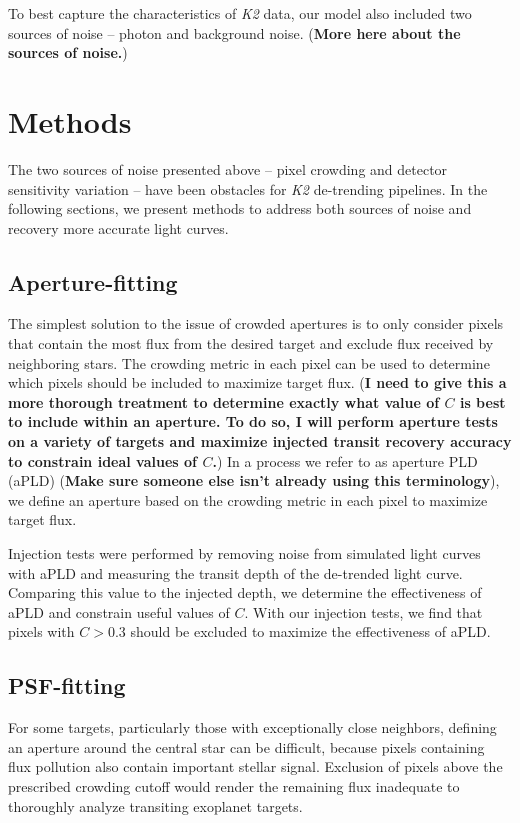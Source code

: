 \documentclass[12pt,preprint]{aastex}
\begin{document}
To best capture the characteristics of \textit{K2} data, our model also included two sources of noise -- photon and background noise. (\textbf{More here about the sources of noise.})

\section{Methods}

The two sources of noise presented above -- pixel crowding and detector sensitivity variation -- have been obstacles for \textit{K2} de-trending pipelines. In the following sections, we present methods to address both sources of noise and recovery more accurate light curves.

\subsection{Aperture-fitting}

The simplest solution to the issue of crowded apertures is to only consider pixels that contain the most flux from the desired target and exclude flux received by neighboring stars. The crowding metric in each pixel can be used to determine which pixels should be included to maximize target flux. (\textbf{I need to give this a more thorough treatment to determine exactly what value of $C$ is best to include within an aperture. To do so, I will perform aperture tests on a variety of targets and maximize injected transit recovery accuracy to constrain ideal values of $C$.}) In a process we refer to as aperture PLD (aPLD) (\textbf{Make sure someone else isn't already using this terminology}), we define an aperture based on the crowding metric in each pixel to maximize target flux. 

Injection tests were performed by removing noise from simulated light curves with aPLD and measuring the transit
depth of the de-trended light curve. Comparing this value to the injected depth, we determine the effectiveness of aPLD and constrain useful values of $C$. With our injection tests, we find that pixels with $C>0.3$ should be excluded to maximize the effectiveness of aPLD.


\subsection{PSF-fitting}

For some targets, particularly those with exceptionally close neighbors, defining an aperture around the central star can be difficult, because pixels containing flux pollution also contain important stellar signal. Exclusion of pixels above the prescribed crowding cutoff would render the remaining flux inadequate to thoroughly analyze transiting exoplanet targets. 
\end{document}
